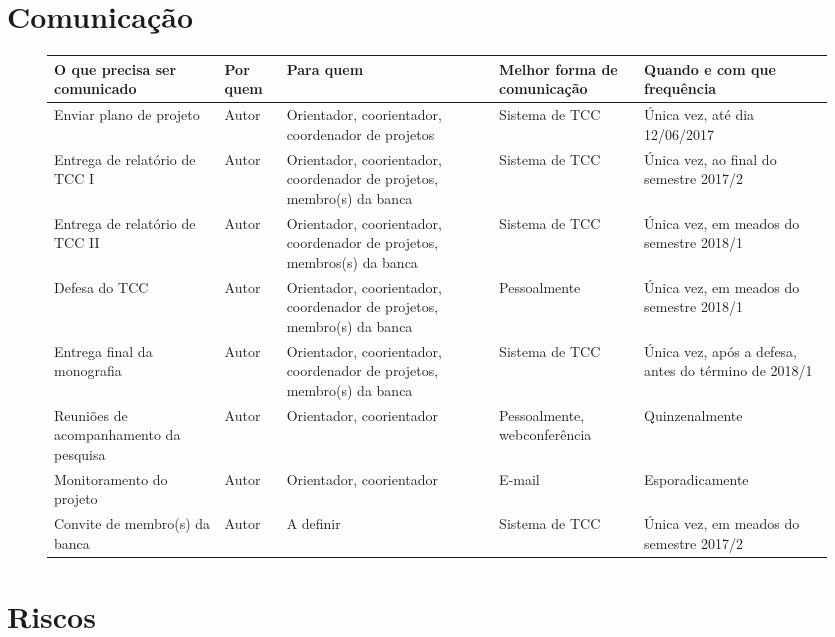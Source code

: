 \documentclass{ufsctex/ufsctex}
\begin{document}
\chapter{Comunicação}

\begin{figure}[htbp]
  \footnotesize
  \begin{tabular}{|P{1.9cm}|P{0.7cm}|P{2.5cm}|P{1.5cm}|P{2cm}|}
    \hline {}
    \textbf{O que precisa ser comunicado} & \textbf{Por quem}
      & \textbf{Para quem} & \textbf{Melhor forma de comunicação}
      & \textbf{Quando e com que frequência} \\
    \hline Enviar plano de projeto & Autor
      & Orientador, coorientador, coordenador de projetos & Sistema de TCC
      & Única vez, até dia 12/06/2017 \\
    \hline Entrega de relatório de TCC I & Autor
      & Orientador, coorientador, coordenador de projetos,
      membro(s) da banca & Sistema de TCC
      & Única vez, ao final do semestre 2017/2 \\
    \hline Entrega de relatório de TCC II & Autor
      & Orientador, coorientador, coordenador de projetos,
      membros(s) da banca & Sistema de TCC
      & Única vez, em meados do semestre 2018/1 \\
    \hline Defesa do TCC & Autor
      & Orientador, coorientador, coordenador de projetos,
      membro(s) da banca & Pessoalmente
      & Única vez, em meados do semestre 2018/1 \\
    \hline Entrega final da monografia & Autor
      & Orientador, coorientador, coordenador de projetos,
      membro(s) da banca & Sistema de TCC
      & Única vez, após a defesa, antes do término de 2018/1 \\
    \hline Reuniões de acompanhamento da pesquisa & Autor
      & Orientador, coorientador & Pessoalmente, webconferência
      & Quinzenalmente \\
    \hline Monitoramento do projeto & Autor
      & Orientador, coorientador & E-mail & Esporadicamente \\
    \hline Convite de membro(s) da banca & Autor & A definir
      & Sistema de TCC & Única vez, em meados do semestre 2017/2 \\
    \hline
  \end{tabular}
\end{figure}

\chapter{Riscos}
\end{document}
